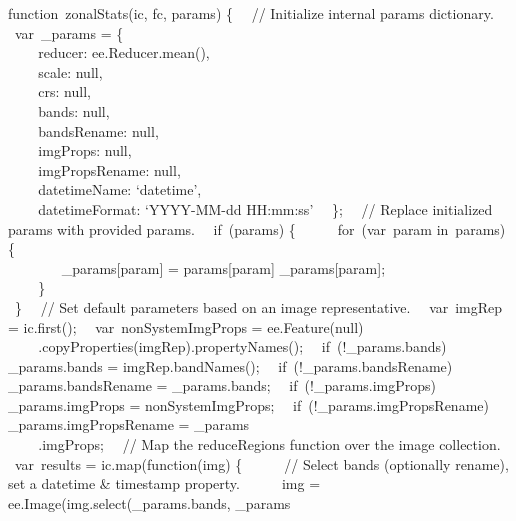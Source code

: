 \documentclass[
  letterpaper,
  DIV=11,
  numbers=noendperiod]{scrreprt}
\begin{document}
function~zonalStats(ic, fc, params) \{~ ~// Initialize internal params
dictionary.~ ~var~\_params = \{\\
\hspace*{0.333em} ~ ~ ~reducer: ee.Reducer.mean(),\\
\hspace*{0.333em} ~ ~ ~scale: null,\\
\hspace*{0.333em} ~ ~ ~crs: null,\\
\hspace*{0.333em} ~ ~ ~bands: null,\\
\hspace*{0.333em} ~ ~ ~bandsRename: null,\\
\hspace*{0.333em} ~ ~ ~imgProps: null,\\
\hspace*{0.333em} ~ ~ ~imgPropsRename: null,\\
\hspace*{0.333em} ~ ~ ~datetimeName: `datetime',\\
\hspace*{0.333em} ~ ~ ~datetimeFormat: `YYYY-MM-dd HH:mm:ss'~ ~\};~ ~//
Replace initialized params with provided params.~ ~if~(params) \{~ ~ ~
~for~(var~param in~params) \{\\
\hspace*{0.333em} ~ ~ ~ ~ ~\_params{[}param{]} = params{[}param{]}
\textbar\textbar{} \_params{[}param{]};\\
\hspace*{0.333em} ~ ~ ~\}\\
\hspace*{0.333em} ~\}~ ~// Set default parameters based on an image
representative.~ ~var~imgRep = ic.first();~ ~var~nonSystemImgProps =
ee.Feature(null)\\
\hspace*{0.333em} ~ ~ ~.copyProperties(imgRep).propertyNames();~
~if~(!\_params.bands) \_params.bands = imgRep.bandNames();~
~if~(!\_params.bandsRename) \_params.bandsRename = \_params.bands;~
~if~(!\_params.imgProps) \_params.imgProps = nonSystemImgProps;~
~if~(!\_params.imgPropsRename) \_params.imgPropsRename = \_params\\
\hspace*{0.333em} ~ ~ ~.imgProps;~ ~// Map the reduceRegions function
over the image collection.~ ~var~results = ic.map(function(img) \{~ ~ ~
~// Select bands (optionally rename), set a datetime \& timestamp
property.~ ~ ~ ~img = ee.Image(img.select(\_params.bands, \_params\\
\end{document}
